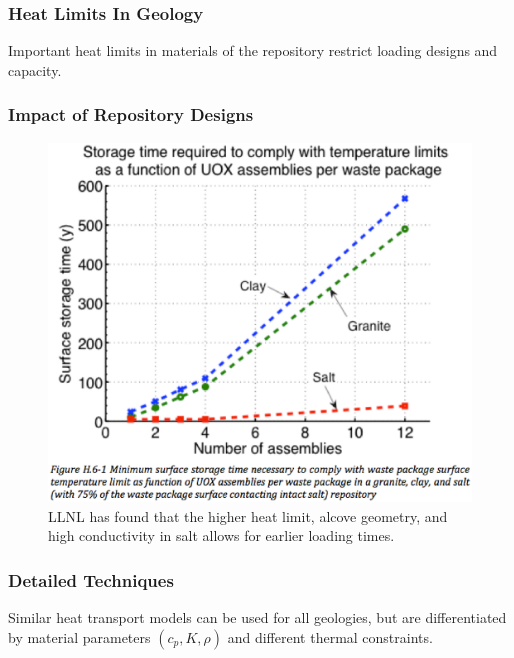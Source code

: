 

\begin{frame}[ctb!]
  \frametitle{Heat Limits In Geology}
  Important heat limits in materials of the repository restrict loading designs 
  and capacity.
  
\end{frame}

\begin{frame}[ctb!]
  \frametitle{Impact of Repository Designs}
   
   \begin{figure}[h!]
     \begin{center}
       \includegraphics[height=.5\textheight]{llnlGeos.eps}
     \end{center}
     \caption{LLNL has found that the higher heat limit, alcove geometry, and 
     high conductivity in salt allows for earlier loading times.}
     \label{fig:llnlGeos}
   \end{figure}
\end{frame}

\begin{frame}[ctb!]
  \frametitle{Detailed Techniques}
  
  Similar heat transport models can be used for all geologies, but are 
  differentiated by material parameters $(c_p, K, \rho)$ and different 
  thermal constraints.
\end{frame}



